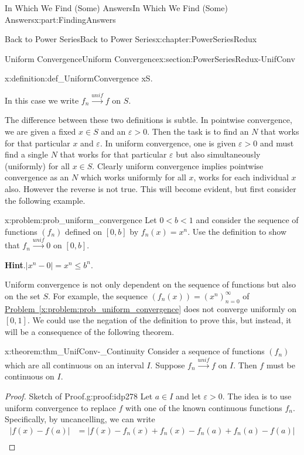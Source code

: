 \documentclass[oneside,10pt,]{book}
\newcommand{\blocktitlefont}{\relax}
\newcommand{\xreffont}{\relax}
\numberwithin{equation}{section}
\newcommand{\eps}{\varepsilon}
\newcommand{\unif}{\stackrel{unif}{\longrightarrow}}
\newcommand{\lt}{<}
\newcommand{\amp}{&}
\begin{document}
\begin{partptx}{In Which We Find (Some) Answers}{}{In Which We Find (Some) Answers}{}{}{x:part:FindingAnswers}
\begin{chapterptx}{Back to Power Series}{}{Back to Power Series}{}{}{x:chapter:PowerSeriesRedux}
\begin{sectionptx}{Uniform Convergence}{}{Uniform Convergence}{}{}{x:section:PowerSeriesRedux-UnifConv}
\begin{definition}{}{x:definition:def_UniformConvergence}
x\in S\).%
\par
In this case we write \(f_n\unif f\) on \(S\).%
\end{definition}
The difference between these two definitions is subtle. In pointwise convergence, we are given a fixed \(x\in S\) and an \(\eps>0\). Then the task is to find an \(N\) that works for that particular \(x\) and \(\eps\). In uniform convergence, one is given \(\eps>0\) and must find a single \(N\) that works for that particular \(\eps\) but also simultaneously (uniformly) for all \(x\in S\). Clearly uniform convergence implies pointwise convergence as an \(N\) which works uniformly for all \(x\), works for each individual \(x\) also. However the reverse is not true. This will become evident, but first consider the following example.%
\begin{problem}{}{x:problem:prob_uniform_convergence}%
Let \(0\lt b\lt 1\) and consider the sequence of functions \(\left(f_n\right)\) defined on \([0,b]\) by \(f_n(x)=x^n\). Use the definition to show that \(f_n\unif 0\) on \([0,b]\).%
\par\smallskip%
\noindent\textbf{\blocktitlefont Hint}.\hypertarget{g:hint:idp277}{}\quad{}\(|x^n-0|=x^n\leq b^n\).%
\end{problem}
Uniform convergence is not only dependent on the sequence of functions but also on the set \(S\). For example, the sequence \(\left(f_n(x)\right)=\left(x^n\right)_{n=0}^\infty\) of \hyperref[x:problem:prob_uniform_convergence]{Problem~{\xreffont\ref{x:problem:prob_uniform_convergence}}} does not converge uniformly on \([0,1]\). We could use the negation of the definition to prove this, but instead, it will be a consequence of the following theorem.%
\begin{theorem}{}{}{x:theorem:thm_UnifConv-_Continuity}%
 Consider a sequence of functions \(\left(f_n\right)\) which are all continuous on an interval \(I\). Suppose \(f_n\unif f\) on \(I\). Then \(f\) must be continuous on \(I\).%
\end{theorem}
\begin{proof}{Sketch of Proof.}{g:proof:idp278}
Let \(a\in I\) and let \(\eps>0\). The idea is to use uniform convergence to replace \(f\) with one of the known continuous functions \(f_n\). Specifically, by uncancelling, we can write%
\begin{align*}
\left|f(x)-f(a)\right|\amp =\left|f(x)-f_n(x)+f_n(x)-f_n(a)+f_n(a)-f(a)\right|\\

\end{align*}
\end{proof}
\end{sectionptx}
\end{chapterptx}
\end{partptx}
\end{document}

